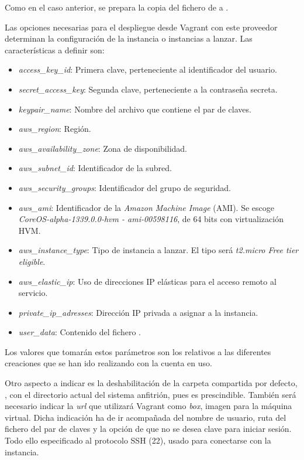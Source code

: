 Como en el caso anterior, se prepara la copia del fichero  de  a .

Las opciones necesarias para el despliegue desde Vagrant con este proveedor determinan la configuración de la instancia o instancias a lanzar. Las características a definir son:
\begin{itemize}
\item \textit{access\_key\_id}: Primera clave, perteneciente al identificador del usuario.
\item \textit{secret\_access\_key}: Segunda clave, perteneciente a la contraseña secreta.
\item \textit{keypair\_name}: Nombre del archivo que contiene el par de claves.
\item \textit{aws\_region}: Región.
\item \textit{aws\_availability\_zone}: Zona de disponibilidad.
\item \textit{aws\_subnet\_id}: Identificador de la subred.
\item \textit{aws\_security\_groups}: Identificador del grupo de seguridad.
\item \textit{aws\_ami}: Identificador de la \textit{Amazon Machine Image} (AMI). Se escoge \textit{CoreOS-alpha-1339.0.0-hvm - ami-00598116}, de 64 bits con virtualización HVM.
\item \textit{aws\_instance\_type}: Tipo de instancia a lanzar. El tipo será \textit{t2.micro Free tier eligible}.
\item \textit{aws\_elastic\_ip}: Uso de direcciones IP elásticas para el acceso remoto al servicio.
\item \textit{private\_ip\_adresses}: Dirección IP privada a asignar a la instancia.
\item \textit{user\_data}: Contenido del fichero .
\end{itemize}

Los valores que tomarán estos parámetros son los relativos a las diferentes creaciones que se han ido realizando con la cuenta en uso.

Otro aspecto a indicar es la deshabilitación de la carpeta compartida por defecto, , con el directorio actual del sistema anfitrión, pues es prescindible. También será necesario indicar la \textit{url} que utilizará Vagrant como \textit{box}, imagen para la máquina virtual. Dicha indicación ha de ir acompañada del nombre de usuario, ruta del fichero del par de claves y la opción de que no se desea clave para iniciar sesión. Todo ello especificado al protocolo SSH (22), usado para conectarse con la instancia.

